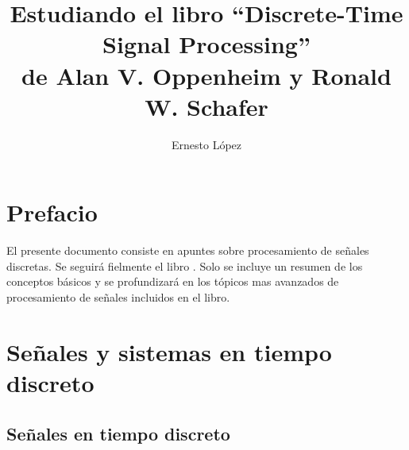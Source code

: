 \documentclass[a4paper]{report}
\title{Estudiando el libro ``Discrete-Time Signal Processing''\\de Alan V. Oppenheim y Ronald W. Schafer}
\author{Ernesto López}
\begin{document}
 

\hypersetup{pageanchor=false}
\maketitle
\hypersetup{pageanchor=true}
\tableofcontents


\chapter*{Prefacio}

El presente documento consiste en apuntes sobre procesamiento de señales discretas. Se seguirá fielmente el libro \cite{oppenheim2009discrete}. Solo se incluye un resumen de los conceptos básicos y se profundizará en los tópicos mas avanzados de procesamiento de señales incluidos en el libro.


\chapter{Señales y sistemas en tiempo discreto}\label{ch:signals_and_systems}

\section{Señales en tiempo discreto}
\end{document}
